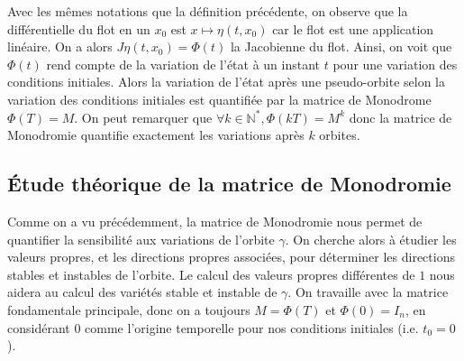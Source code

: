 \documentclass[12pt]{article}
\theoremstyle{definition}
\theoremstyle{definition}
\begin{document}
	Avec les mêmes notations que la définition précédente, on observe que la différentielle du flot en un $x_0$ est $x \mapsto \eta(t,x_0)$ car le flot est une application linéaire. On a alors $J\eta(t,x_0) = \Phi(t)$ la Jacobienne du flot. Ainsi, on voit que $\Phi(t)$ rend compte de la variation de l'état à un instant $t$ pour une variation des conditions initiales. Alors la variation de l'état après une pseudo-orbite selon la variation des conditions initiales est quantifiée par la matrice de Monodrome $\Phi(T) = M$. On peut remarquer que $\forall k \in \mathbb{N}^*, \Phi(kT) = M^k$ donc la matrice de Monodromie quantifie exactement les variations après $k$ orbites.
	
	
	
	
	
	
	\subsection{Étude théorique de la matrice de Monodromie}
	
	Comme on a vu précédemment, la matrice de Monodromie nous permet de quantifier la sensibilité aux variations de l'orbite $\gamma$. On cherche alors à étudier les valeurs propres, et les directions propres associées, pour déterminer les directions stables et instables de l'orbite. Le calcul des valeurs propres différentes de $1$ nous aidera au calcul des variétés stable et instable de $\gamma$. On travaille avec la matrice fondamentale principale, donc on a toujours $M = \Phi(T)$ et $\Phi(0) = I_n$, en considérant $0$ comme l'origine temporelle pour nos conditions initiales (i.e. $t_0 = 0$).
	
\end{document}
